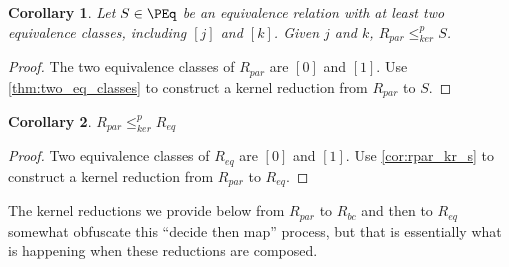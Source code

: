 \documentclass{article}
\newtheorem{corollary}[corollary]{Corollary}
\theoremstyle{definition} \newtheorem{definition}[definition]{Definition}
\newcommand{\kr}{\leq^{p}_{ker}} %
\begin{document}
\begin{corollary}\label{cor:rpar_kr_s}
  Let $S\in\PEq$ be an equivalence relation with at least two equivalence
  classes, including $[j]$ and $[k]$. Given $j$ and $k$, $R_{par}\kr S$.
\end{corollary}
\begin{proof}
  The two equivalence classes of $R_{par}$ are $[0]$ and $[1]$. Use
  \autoref{thm:two_eq_classes} to construct a kernel reduction from $R_{par}$
  to $S$.
\end{proof}

\begin{corollary}
  $R_{par}\kr R_{eq}$
\end{corollary}
\begin{proof}
  Two equivalence classes of $R_{eq}$ are $[0]$ and $[1]$. Use
  \autoref{cor:rpar_kr_s} to construct a kernel reduction from $R_{par}$ to
  $R_{eq}$.
\end{proof}

The kernel reductions we provide below from $R_{par}$ to $R_{bc}$ and then to
$R_{eq}$ somewhat obfuscate this ``decide then map'' process, but that is
essentially what is happening when these reductions are composed.
\end{document}
